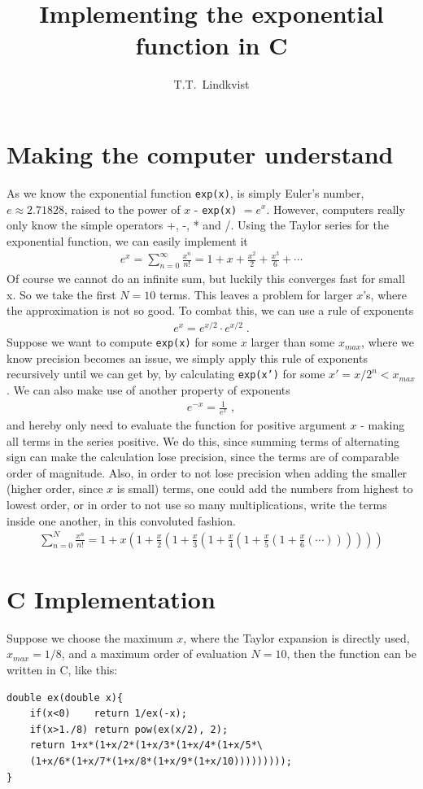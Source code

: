 \documentclass{article}
\title{Implementing the exponential function in C}
\author{T.T.~Lindkvist}
\date{}
\begin{document}
    \maketitle
    \section{Making the computer understand}
    As we know the exponential function \texttt{exp(x)}, is simply Euler's number, $e\approx2.71828$, raised to the power of $x$ - \texttt{exp(x)} $=e^x$. However, computers really only know the simple operators +, -, * and /. Using the Taylor series for the exponential function, we can easily implement it
    \begin{align}
        e^x = \sum_{n=0}^{\infty} \frac{x^n}{n!} = 1 + x + \frac{x^2}{2} + \frac{x^3}{6} + \cdots
    \end{align}
	Of course we cannot do an infinite sum, but luckily this converges fast for small x. So we take the first $N=10$ terms. This leaves a problem for larger $x$'s, where the approximation is not so good. To combat this, we can use a rule of exponents
	\begin{align}
		e^x = e^{x/2}\cdot e^{x/2} \;.
	\end{align}
	Suppose we want to compute \texttt{exp(x)} for some $x$ larger than some $x_{max}$, where we know precision becomes an issue, we simply apply this rule of exponents recursively until we can get by, by calculating \texttt{exp(x')} for some $x'=x/2^n<x_{max}$.
	We can also make use of another property of exponents
	\begin{align}
		e^{-x} = \frac{1}{e^x} \;,
	\end{align}
	and hereby only need to evaluate the function for positive argument $x$ - making all terms in the series positive. We do this, since summing terms of alternating sign can make the calculation lose precision, since the terms are of comparable order of magnitude. Also, in order to not lose precision when adding the smaller (higher order, since $ x $ is small) terms, one could add the numbers from highest to lowest order, or in order to not use so many multiplications, write the terms inside one another, in this convoluted fashion.
	\begin{align*}
		\sum_{n=0}^{N} \frac{x^n}{n!} = 
		1+x\left(1+\frac{x}{2}\left(1+\frac{x}{3}\left(1+\frac{x}{4}\left(1+\frac{x}{5}\left(1+\frac{x}{6}\left(\cdots\right)\right)\right)\right)\right)\right)
	\end{align*}
\section{C Implementation}
Suppose we choose the maximum $ x $, where the Taylor expansion is directly used, $ x_{max} = 1/8 $, and a maximum order of evaluation $ N=10 $, then the function can be written in C, like this:
\lstset{language=Pascal}
\begin{lstlisting}
double ex(double x){
    if(x<0)    return 1/ex(-x);
    if(x>1./8) return pow(ex(x/2), 2);
    return 1+x*(1+x/2*(1+x/3*(1+x/4*(1+x/5*\
    (1+x/6*(1+x/7*(1+x/8*(1+x/9*(1+x/10)))))))));
}
\end{lstlisting}
\end{document}
